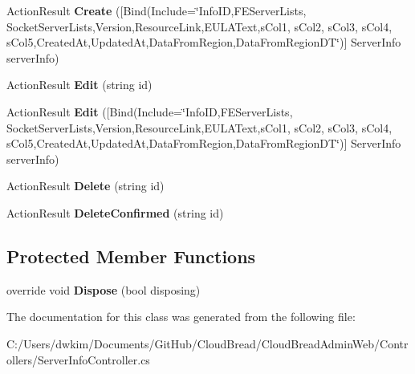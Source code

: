 \begin{DoxyCompactItemize}
\item 
Action\+Result {\bfseries Create} (\mbox{[}Bind(Include=\char`\"{}Info\+ID,F\+E\+Server\+Lists, Socket\+Server\+Lists,Version,Resource\+Link,E\+U\+L\+A\+Text,s\+Col1, s\+Col2, s\+Col3, s\+Col4, s\+Col5,Created\+At,Updated\+At,Data\+From\+Region,Data\+From\+Region\+DT\char`\"{})\mbox{]} Server\+Info server\+Info)\hypertarget{class_cloud_bread_admin_web_1_1_controllers_1_1_server_info_controller_af5b78d093d9e392457328ffb969d8c69}{}\label{class_cloud_bread_admin_web_1_1_controllers_1_1_server_info_controller_af5b78d093d9e392457328ffb969d8c69}

\item 
Action\+Result {\bfseries Edit} (string id)\hypertarget{class_cloud_bread_admin_web_1_1_controllers_1_1_server_info_controller_a795e1309028b91eb247be00c83944efa}{}\label{class_cloud_bread_admin_web_1_1_controllers_1_1_server_info_controller_a795e1309028b91eb247be00c83944efa}

\item 
Action\+Result {\bfseries Edit} (\mbox{[}Bind(Include=\char`\"{}Info\+ID,F\+E\+Server\+Lists, Socket\+Server\+Lists,Version,Resource\+Link,E\+U\+L\+A\+Text,s\+Col1, s\+Col2, s\+Col3, s\+Col4, s\+Col5,Created\+At,Updated\+At,Data\+From\+Region,Data\+From\+Region\+DT\char`\"{})\mbox{]} Server\+Info server\+Info)\hypertarget{class_cloud_bread_admin_web_1_1_controllers_1_1_server_info_controller_accf134cd6c54f75a45adeb5b02300789}{}\label{class_cloud_bread_admin_web_1_1_controllers_1_1_server_info_controller_accf134cd6c54f75a45adeb5b02300789}

\item 
Action\+Result {\bfseries Delete} (string id)\hypertarget{class_cloud_bread_admin_web_1_1_controllers_1_1_server_info_controller_a09a9ce8007e1527562cc61b9456b0399}{}\label{class_cloud_bread_admin_web_1_1_controllers_1_1_server_info_controller_a09a9ce8007e1527562cc61b9456b0399}

\item 
Action\+Result {\bfseries Delete\+Confirmed} (string id)\hypertarget{class_cloud_bread_admin_web_1_1_controllers_1_1_server_info_controller_ad5c65a60ec3425e0afec0bcc31653bc1}{}\label{class_cloud_bread_admin_web_1_1_controllers_1_1_server_info_controller_ad5c65a60ec3425e0afec0bcc31653bc1}

\end{DoxyCompactItemize}
\subsection*{Protected Member Functions}
\begin{DoxyCompactItemize}
\item 
override void {\bfseries Dispose} (bool disposing)\hypertarget{class_cloud_bread_admin_web_1_1_controllers_1_1_server_info_controller_acb79d1d916950d297524b6a7c1240771}{}\label{class_cloud_bread_admin_web_1_1_controllers_1_1_server_info_controller_acb79d1d916950d297524b6a7c1240771}

\end{DoxyCompactItemize}


The documentation for this class was generated from the following file\+:\begin{DoxyCompactItemize}
\item 
C\+:/\+Users/dwkim/\+Documents/\+Git\+Hub/\+Cloud\+Bread/\+Cloud\+Bread\+Admin\+Web/\+Controllers/Server\+Info\+Controller.\+cs\end{DoxyCompactItemize}
